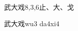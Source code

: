 \begin{entry}{武大戏}{8,3,6}{⽌、⼤、⼽}
  \begin{phonetics}{武大戏}{wu3 da4xi4}
  \end{phonetics}
\end{entry}
